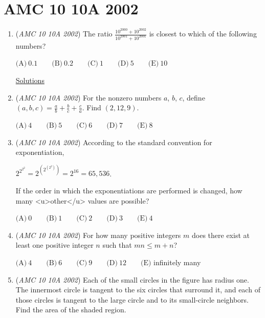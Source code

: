 \section{AMC 10 10A 2002}
        \begin{enumerate}
        	\item (\textit{AMC 10 10A 2002}) The ratio $\frac{10^{2000}+10^{2002}}{10^{2001}+10^{2001}}$ is closest to which of the following numbers?


 $\text{(A)}\ 0.1 \qquad \text{(B)}\ 0.2 \qquad \text{(C)}\ 1 \qquad \text{(D)}\ 5 \qquad \text{(E)}\ 10$


 \href{https://artofproblemsolving.com/wiki/index.php?title=2002\_AMC\_10A\_Problems/Problem\_1}{Solutions}


 

	\item (\textit{AMC 10 10A 2002}) For the nonzero numbers $a$, $b$, $c$, define $(a, b, c) = \frac{a}{b} + \frac{b}{c} + \frac{c}{a}$. Find $(2, 12, 9)$.


 $\text{(A)}\ 4 \qquad \text{(B)}\ 5 \qquad \text{(C)}\ 6 \qquad \text{(D)}\ 7 \qquad \text{(E)}\ 8$


	\item (\textit{AMC 10 10A 2002}) According to the standard convention for exponentiation, 


 $2^{2^{2^2}} = 2^{\left(2^{\left(2^2\right)}\right)} = 2^{16} = 65,536$.


 If the order in which the exponentiations are performed is changed, how many <u>other</u> values are possible?


 

$\text{(A)}\ 0 \qquad \text{(B)}\ 1 \qquad \text{(C)}\ 2 \qquad \text{(D)}\ 3 \qquad \text{(E)}\ 4$


	\item (\textit{AMC 10 10A 2002}) For how many positive integers $m$ does there exist at least one positive integer $n$ such that $mn \le m + n$?


 $\text{(A)}\ 4 \qquad \text{(B)}\ 6 \qquad \text{(C)}\ 9 \qquad \text{(D)}\ 12 \qquad \text{(E)}$ infinitely many


 

	\item (\textit{AMC 10 10A 2002}) Each of the small circles in the figure has radius one. The innermost circle is tangent to the six circles that surround it, and each of those circles is tangent to the large circle and to its small-circle neighbors. Find the area of the shaded region.



\end{enumerate}
